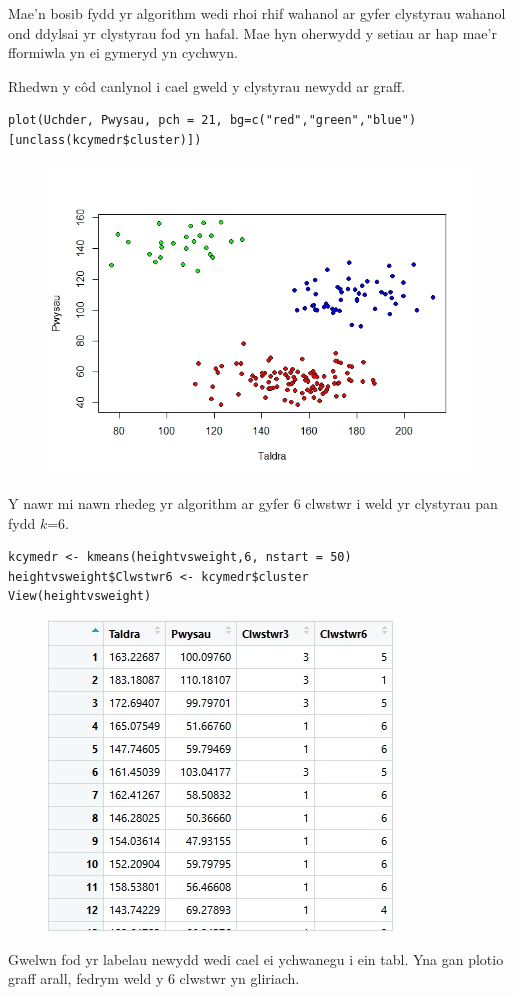 Mae'n bosib fydd yr algorithm wedi rhoi rhif wahanol ar gyfer clystyrau wahanol ond ddylsai yr clystyrau fod yn hafal. Mae hyn oherwydd y setiau ar hap mae'r fformiwla yn ei gymeryd yn cychwyn.

Rhedwn y c\^{o}d canlynol i cael gweld y clystyrau newydd ar graff.

\begin{verbatim}
plot(Uchder, Pwysau, pch = 21, bg=c("red","green","blue")[unclass(kcymedr$cluster)])
\end{verbatim}

\begin{figure}[h]
\includegraphics[width=0.5\linewidth]{../img/3clwstwrR.jpeg}
\end{figure}

Y nawr mi nawn rhedeg yr algorithm ar gyfer 6 clwstwr i weld yr clystyrau pan fydd $k$=6. 

\begin{verbatim}
kcymedr <- kmeans(heightvsweight,6, nstart = 50)
heightvsweight$Clwstwr6 <- kcymedr$cluster
View(heightvsweight)
\end{verbatim}

\begin{figure}[h]
\includegraphics[width=0.5\linewidth]{../img/Data6_yn_R.jpg}
\end{figure}

Gwelwn fod yr labelau newydd wedi cael ei ychwanegu i ein tabl. Yna gan plotio graff arall, fedrym weld y 6 clwstwr yn gliriach.

